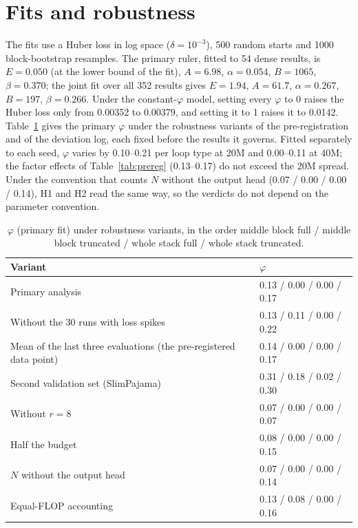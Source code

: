\section{Fits and robustness}
\label{app:fits}

The fits use a Huber loss in log space ($\delta = 10^{-3}$), 500 random starts and 1000 block-bootstrap resamples. The
primary ruler, fitted to 54 dense results, is $E = 0.050$ (at the lower bound of the fit), $A = 6.98$,
$\alpha = 0.054$, $B = 1065$, $\beta = 0.370$; the joint fit over all 352 results gives $E = 1.94$, $A = 61.7$,
$\alpha = 0.267$, $B = 197$, $\beta = 0.266$. Under the constant-$\varphi$ model, setting every $\varphi$ to 0 raises the
Huber loss only from 0.00352 to 0.00379, and setting it to 1 raises it to 0.0142. Table~\ref{tab:robust} gives the
primary $\varphi$ under the robustness variants of the pre-registration and of the deviation log, each fixed before the
results it governs. Fitted separately to each seed, $\varphi$ varies by
0.10--0.21 per loop type at 20M and 0.00--0.11 at 40M; the factor effects of Table~\ref{tab:prereg} (0.13--0.17) do not exceed
the 20M spread. Under the convention that counts $N$ without the output head (0.07 / 0.00 / 0.00 / 0.14), H1 and H2
read the same way, so the verdicts do not depend on the parameter convention.

\begin{table}[h]
  \centering
  \caption{$\varphi$ (primary fit) under robustness variants, in the order middle block full / middle block truncated /
  whole stack full / whole stack truncated.}
  \label{tab:robust}
  \small
  \begin{tabular}{ll}
    \toprule
    Variant & $\varphi$ \\
    \midrule
    Primary analysis & 0.13 / 0.00 / 0.00 / 0.17 \\
    Without the 30 runs with loss spikes & 0.13 / 0.11 / 0.00 / 0.22 \\
    Mean of the last three evaluations (the pre-registered data point) & 0.14 / 0.00 / 0.00 / 0.17 \\
    Second validation set (SlimPajama) & 0.31 / 0.18 / 0.02 / 0.30 \\
    Without $r = 8$ & 0.07 / 0.00 / 0.00 / 0.07 \\
    Half the budget & 0.08 / 0.00 / 0.00 / 0.15 \\
    $N$ without the output head & 0.07 / 0.00 / 0.00 / 0.14 \\
    Equal-FLOP accounting & 0.13 / 0.08 / 0.00 / 0.16 \\
    \bottomrule
  \end{tabular}
\end{table}

